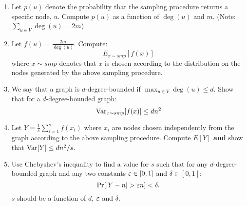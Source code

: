 \begin{enumerate}
\item Let $p(u)$ denote the probability that the sampling procedure returns a specific
node, $u$. Compute $p(u)$ as a function of $\deg(u)$ and $m$. (Note:
$\sum_{u \in V} \deg(u) = 2m$)
\item Let $f(u) = \frac{2m}{\deg(u)}$. Compute:
\[
E_{x \sim smp} [f(x)]
\]
where $x \sim smp$ denotes that $x$ is chosen according to the
distribution on the nodes generated by the above sampling procedure.
\item We say that a graph is $d$-degree-bounded if $\max_{u \in V} \deg(u) \le
d$. Show that for a $d$-degree-bounded graph:
\[
{\operatorname{Var}}_{x \sim smp} [f(x)] \le dn^2
\]
\item Let $Y = \frac{1}{s}\sum_{i=1}^{s} f(x_i)$ where $x_i$ are
nodes chosen independently from the graph according to the above
sampling procedure. Compute $E[Y]$ {\bf and} show that ${\operatorname{Var}}[Y] \le
dn^2/s$.
\item Use Chebyshev's inequality to find a value for $s$ such that 
for any $d$-degree-bounded graph and any two constants $\varepsilon \in
[0,1]$ and $\delta \in [0,1]$:
\[
\Pr[|Y - n| > \varepsilon n ] < \delta.
\]
$s$ should be a function of $d$, $\varepsilon$ and $\delta$.

\end{enumerate}
\pagebreak



